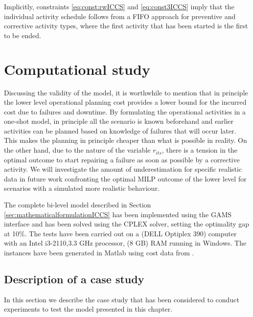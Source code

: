 Implicitly, constraints \eqref{eq:const:rwICCS} and \eqref{eq:const3ICCS} imply that the individual activity schedule follows from a FIFO approach for preventive and corrective activity types, where the first activity that has been started is the first to be ended.




\section{Computational study}
\label{sec:computationalstudyICCS}

Discussing the validity of the model, it is worthwhile to mention that in principle the lower level operational planning cost provides a lower bound for the incurred cost due to failures and downtime. By formulating the operational activities in a one-shot model, in principle all the scenario is known beforehand and earlier activities can be planned based on knowledge of failures that will occur later. This makes the planning in principle cheaper than what is possible in reality. On the other hand, due to the  nature of the variable $r_{its}$, there is a tension in the optimal outcome to start repairing a failure as soon as possible by a corrective activity. We will investigate the amount of underestimation for specific realistic data in future work confronting the optimal MILP outcome of the lower level for scenarios with a simulated more realistic behaviour.

The complete bi-level model described in Section \ref{sec:mathematicalformulationICCS} has been implemented using the GAMS interface \cite{gams} and has been solved using the CPLEX solver, setting the optimality gap at 10\%. The tests have been carried out on a (DELL Optiplex 390) computer with an Intel i3-2110,3.3 GHz processor, (8 GB) RAM running in Windows. The instances have been generated in Matlab using cost data from \cite{obdam}.

\subsection{Description of a case study}
\label{subsec:casestudy}
In this section we describe the case study that has been considered to conduct experiments to test the model presented in this chapter.

